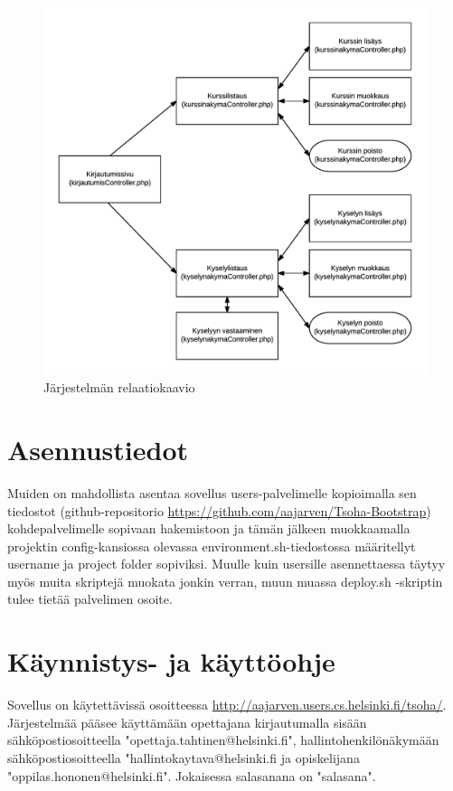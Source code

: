 \documentclass[12pt,a4paper,titlepage]{article}
\begin{document}
\begin{figure}
   \centering
   \includegraphics[width=\textwidth]{kuvat/komponenttirakenne.png}
   \caption{Järjestelmän relaatiokaavio}\label{fig:komponentit}
\end{figure}

\section{Asennustiedot}
Muiden on mahdollista asentaa sovellus users-palvelimelle kopioimalla sen tiedostot (github-repositorio \url{https://github.com/aajarven/Tsoha-Bootstrap}) kohdepalvelimelle sopivaan hakemistoon ja tämän jälkeen muokkaamalla projektin config-kansiossa olevassa envi\-ronment.sh-tiedostossa määritellyt username ja project folder sopiviksi. Muulle kuin usersille asennettaessa täytyy myös muita skriptejä muokata jonkin verran, muun muassa deploy.sh -skriptin tulee tietää palvelimen osoite.


\section{Käynnistys- ja käyttöohje}
Sovellus on käytettävissä osoitteessa \url{http://aajarven.users.cs.helsinki.fi/tsoha/}. Järjestelmää pääsee käyttämään opettajana kirjautumalla sisään sähköpostiosoitteella "opettaja.tahtinen@helsinki.fi", hallintohenkilönäkymään sähköpostiosoitteella "hallintokaytava@helsinki.fi ja opiskelijana "oppilas.hononen@helsinki.fi". Jokaisessa salasanana on "salasana". 
\end{document}
